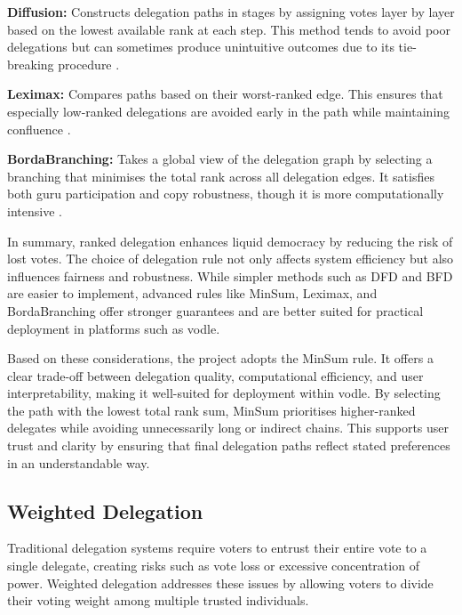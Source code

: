 \textbf{Diffusion:} Constructs delegation paths in stages by assigning votes layer by layer based on the lowest available rank at each step. This method tends to avoid poor delegations but can sometimes produce unintuitive outcomes due to its tie-breaking procedure \citep{brill_liquid_2022}.

\textbf{Leximax:} Compares paths based on their worst-ranked edge. This ensures that especially low-ranked delegations are avoided early in the path while maintaining confluence \citep{brill_liquid_2022}.

\textbf{BordaBranching:} Takes a global view of the delegation graph by selecting a branching that minimises the total rank across all delegation edges. It satisfies both guru participation and copy robustness, though it is more computationally intensive \citep{brill_liquid_2022}.

In summary, ranked delegation enhances liquid democracy by reducing the risk of lost votes. The choice of delegation rule not only affects system efficiency but also influences fairness and robustness. While simpler methods such as DFD and BFD are easier to implement, advanced rules like MinSum, Leximax, and BordaBranching offer stronger guarantees and are better suited for practical deployment in platforms such as vodle.

Based on these considerations, the project adopts the MinSum rule. It offers a clear trade-off between delegation quality, computational efficiency, and user interpretability, making it well-suited for deployment within vodle. By selecting the path with the lowest total rank sum, MinSum prioritises higher-ranked delegates while avoiding unnecessarily long or indirect chains. This supports user trust and clarity by ensuring that final delegation paths reflect stated preferences in an understandable way.


\subsection*{Weighted Delegation}\label{subsec:background_weighted_delegation}

Traditional delegation systems require voters to entrust their entire vote to a single delegate, creating risks such as vote loss or excessive concentration of power. Weighted delegation addresses these issues by allowing voters to divide their voting weight among multiple trusted individuals.


